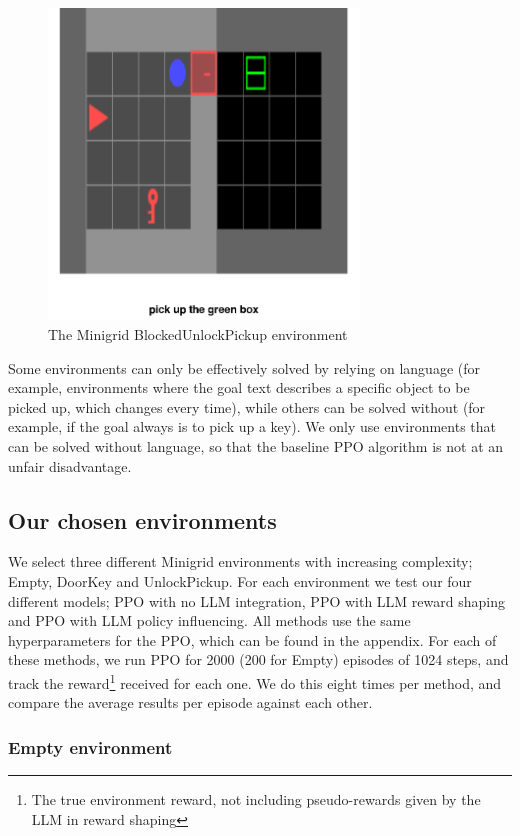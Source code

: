 \documentclass[conference]{IEEEtran}
\begin{document}
\begin{figure}[h]
\centerline{\includegraphics[width=3.25in]{figure/blockedunlockpickupenv.png}}
\caption{The Minigrid BlockedUnlockPickup environment}
\label{blockedunlockpickupenv}
\end{figure}

Some environments can only be effectively solved by relying on language (for example, environments where the goal text describes a specific object to be picked up, which changes every time), while others can be solved without (for example, if the goal always is to pick up a key). We only use environments that can be solved without language, so that the baseline PPO algorithm is not at an unfair disadvantage.

\subsection{Our chosen environments}

We select three different Minigrid environments with increasing complexity; Empty, DoorKey and UnlockPickup. For each environment we test our four different models; PPO with no LLM integration, PPO with LLM reward shaping and PPO with LLM policy influencing. All methods use the same hyperparameters for the PPO, which can be found in the appendix. For each of these methods, we run PPO for 2000 (200 for Empty) episodes of 1024 steps, and track the reward\footnote{The true environment reward, not including pseudo-rewards given by the LLM in reward shaping} received for each one. We do this eight times per method, and compare the average results per episode against each other.

\subsubsection{Empty environment}
\end{document}
